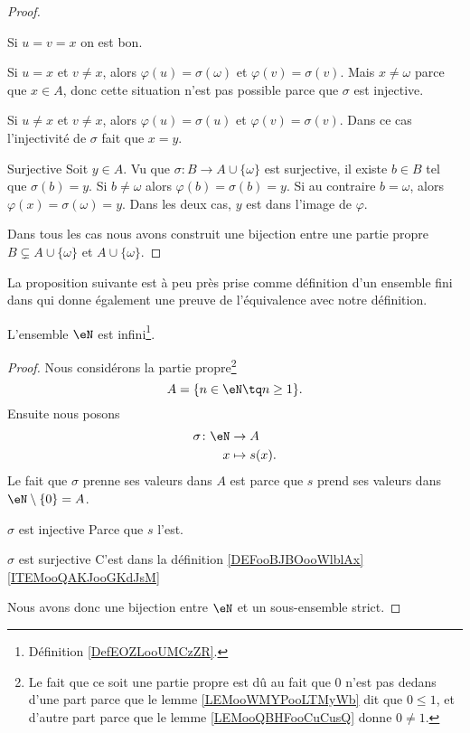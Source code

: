 \begin{proof}
\begin{subproof}
\begin{subproof}
            Si \( u=v=x\) on est bon.

            Si \( u=x\) et \( v\neq x\), alors \( \varphi(u)=\sigma(\omega)\) et \( \varphi(v)=\sigma(v)\). Mais \( x\neq \omega\) parce que \( x\in A\), donc cette situation n'est pas possible parce que \( \sigma\) est injective.

            Si \( u\neq x\) et \( v\neq x\), alors \( \varphi(u)=\sigma(u)\) et \( \varphi(v)=\sigma(v)\). Dans ce cas l'injectivité de \( \sigma\) fait que \( x=y\).
        \item[Surjective]
            Soit \( y\in A\). Vu que \( \sigma\colon B\to A\cup\{ \omega \}\) est surjective, il existe \( b\in B\) tel que \(\sigma(b)=y\). Si \( b\neq \omega\) alors \( \varphi(b)=\sigma(b)=y\). Si au contraire \( b=\omega\), alors \( \varphi(x)=\sigma(\omega)=y\). Dans les deux cas, \( y\) est dans l'image de \( \varphi\).
        \end{subproof}
    \end{subproof}
    Dans tous les cas nous avons construit une bijection entre une partie propre \( B\subsetneq A\cup\{ \omega \}\) et \( A\cup\{ \omega \}\).
\end{proof}

La proposition suivante est à peu près prise comme définition d'un ensemble fini dans \cite{ooVAYLooJxVYex} qui donne également une preuve de l'équivalence avec notre définition. 
\begin{proposition}     \label{PROPooBYKCooGDkfWy}
    L'ensemble \( \eN\) est infini\footnote{Définition \ref{DefEOZLooUMCzZR}.}.
\end{proposition}

\begin{proof}
    Nous considérons la partie propre\footnote{Le fait que ce soit une partie propre est dû au fait que \( 0\) n'est pas dedans d'une part parce que le lemme \ref{LEMooWMYPooLTMyWb} dit que \( 0\leq 1\), et d'autre part parce que le lemme \ref{LEMooQBHFooCuCusQ} donne \( 0\neq 1\).}
    \begin{equation}
        A=\{ n\in \eN\tq n\geq 1 \}.
    \end{equation}
    Ensuite nous posons
    \begin{equation}
        \begin{aligned}
            \sigma\colon \eN&\to A \\
            x&\mapsto s(x). 
        \end{aligned}
    \end{equation}
    Le fait que \( \sigma\) prenne ses valeurs dans \( A\) est parce que \( s\) prend ses valeurs dans \( \eN\setminus\{ 0 \}=A\).
    \begin{subproof}
    \item[\( \sigma\) est injective]
        Parce que \( s\) l'est.
    \item[\( \sigma\) est surjective]
        C'est dans la définition \ref{DEFooBJBOooWlblAx}\ref{ITEMooQAKJooGKdJsM}
    \end{subproof}
    Nous avons donc une bijection entre \( \eN\) et un sous-ensemble strict.
\end{proof}

